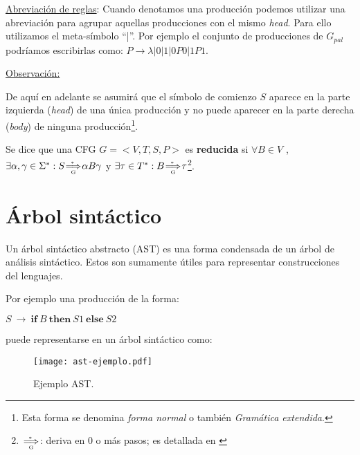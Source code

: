 \underline{Abreviación de reglas}: Cuando denotamos una producción podemos utilizar una abreviación para agrupar aquellas producciones con el mismo \textit{head}. Para ello utilizamos el meta-símbolo ``|''. Por ejemplo el conjunto de producciones de $G_{pal}$ podríamos escribirlas como: $P \rightarrow \lambda | 0 | 1 | 0P0 | 1P1$.

\underline{Observación:}

De aquí en adelante se asumirá que el símbolo de comienzo $S$  aparece en la parte izquierda (\textit{head}) de una única producción y no puede aparecer en la parte derecha (\textit{body}) de ninguna producción\footnote{Esta forma se denomina \emph{forma normal} o también \textit{Gramática extendida}.}. \\


\begin{definition} Se dice que una CFG $G=<V,T,S,P>$
es \textbf{reducida} si
$\forall B \in V$ , $\exists \alpha , \gamma \in \Sigma^{*} : S \clausderiva{G} \alpha B \gamma$ y $\exists \tau \in T^{*} : B \clausderiva{G} \tau$\footnote{ $\clausderiva{G}$: deriva en $0$ o más pasos; es detallada en \cite{tesismarcelo}}.
\label{def:reducida}
\end{definition}

\section{Árbol sintáctico}

Un árbol sintáctico abstracto (AST) es una forma condensada de un árbol de análisis sintáctico. Estos son sumamente útiles para representar construcciones del lenguajes.

Por ejemplo una producción de la forma:
\begin{center}\large
$S\ \rightarrow\ \textbf{if}\ B\ \textbf{then}\ S1\ \textbf{else}\ S2$                                                                      \end{center}
puede representarse en un árbol sintáctico como:

\begin{figure}[!ht]\centering
\texttt{[image: ast-ejemplo.pdf]}
\caption{\label{ejem-ast} Ejemplo AST.}
\end{figure}

